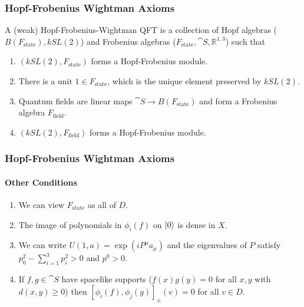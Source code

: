 \documentclass{beamer}
\begin{document}
\begin{frame}
\frametitle{Hopf-Frobenius Wightman Axioms}

A (weak) Hopf-Frobenius-Wightman QFT is a collection of Hopf algebras ($B(F_{\text{state}}), k SL(2)$)  and Frobenius algebras ($F_{\text{state}}, \cat{S}, \mathbb{R}^{1,3}$)  such that

\begin{enumerate}


\item {} $(k SL(2),F_{\text{state}})$ forms a Hopf-Frobenius module.

\item {} There is a unit $1 \in F_{\text{state}}$, which is the unique element preserved by $k SL(2)$.

\item {} Quantum fields are linear maps $\cat{S} \to B(F_{\text{state}})$ and form a Frobenius algebra $F_{\text{field}}$.

\item {} $(k SL(2),F_{\text{field}})$ forms a Hopf-Frobenius module.





\end{enumerate}


\end{frame}




\begin{frame}
\frametitle{Hopf-Frobenius Wightman Axioms}
\framesubtitle{Other Conditions}

\begin{enumerate}

\item {} We can view $F_{\text{state}}$ as all of $D$.


\item {} The image of polynomials in $\phi_i(f)$ on $\ket{0}$ is dense in $X$.


\item {} We can write $U(1,a) = \exp(i P^{\mu} a_\mu)$ and the eigenvalues of $P$ satisfy $p_0^2 - \sum_{i=1}^3 p_i^2 > 0$ and $p^0 > 0$.


\item {}  If $f,g \in \cat{S}$ have spacelike supports ($f(x) g(y) = 0$ for all $x,y$ with $d(x,y) \geq 0$) then $[\phi_i (f), \phi_j (g)]_{\pm}(v) = 0$ for all $v \in D$.


\end{enumerate}
\end{frame}
\end{document}
